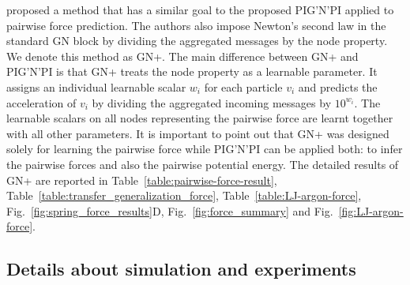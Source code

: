 \documentclass{article}
\newcommand{\pignpi}{PIG'N'PI\xspace}
\newcommand{\lemos}{GN+\xspace}
\begin{document}
\citet{lemos2021rediscovering} proposed a method that has a similar goal to the proposed \pignpi applied to pairwise force prediction. The authors also impose Newton's second law in the standard GN block by dividing the aggregated messages by the node property. We denote this method as \lemos. The main difference between \lemos and \pignpi is that \lemos treats the node property as a learnable parameter. It assigns an individual learnable scalar $w_i$ for each particle $v_i$ and predicts the acceleration of $v_i$ by dividing the aggregated incoming messages by $10^{w_i}$. The learnable scalars on all nodes representing the pairwise force are learnt together with all other parameters. It is important to point out that \lemos was designed solely for learning the pairwise force while \pignpi can be applied both: to infer the pairwise forces and also the pairwise potential energy. The detailed results of \lemos are reported in Table~\ref{table:pairwise-force-result}, Table~\ref{table:transfer_generalization_force}, Table~\ref{table:LJ-argon-force}, Fig.~\ref{fig:spring_force_results}D, Fig.~\ref{fig:force_summary} and Fig.~\ref{fig:LJ-argon-force}.




\subsection{Details about simulation and experiments}
\label{sec:experiment_setting}
\end{document}
